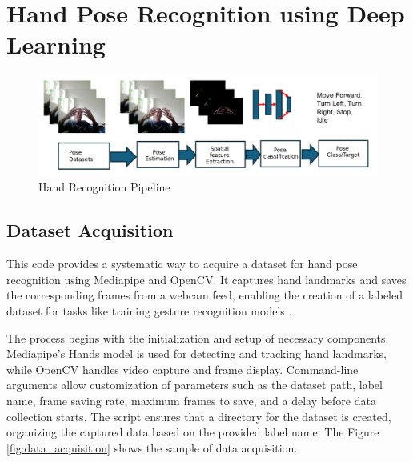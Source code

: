 
\chapter{Hand Pose Recognition using Deep Learning}
\begin{figure}[h!]
	\centering
	\includegraphics[width=\linewidth]{img/pose_pipeline} %
	\caption{Hand Recognition Pipeline}
	\label{fig:pose_pipeline} %
\end{figure}

\section{Dataset Acquisition}
This code provides a systematic way to acquire a dataset for hand pose recognition using Mediapipe and OpenCV. It captures hand landmarks and saves the corresponding frames from a webcam feed, enabling the creation of a labeled dataset for tasks like training gesture recognition models \cite{LIU2024128049}.

The process begins with the initialization and setup of necessary components. Mediapipe's Hands model is used for detecting and tracking hand landmarks, while OpenCV handles video capture and frame display. Command-line arguments allow customization of parameters such as the dataset path, label name, frame saving rate, maximum frames to save, and a delay before data collection starts. The script ensures that a directory for the dataset is created, organizing the captured data based on the provided label name. The Figure \ref{fig:data_acquisition} shows the sample of data acquisition.

